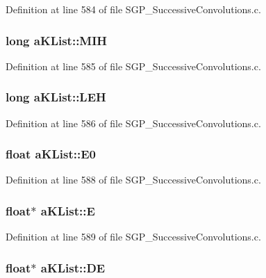 Definition at line 584 of file SGP\_\-SuccessiveConvolutions.c.\hypertarget{structaKList_8f19ff32d2995a7f54a9fbd164cdb29a}{
\subsubsection[MIH]{\setlength{\rightskip}{0pt plus 5cm}long {\bf aKList::MIH}}}
\label{d8/d05/structaKList_8f19ff32d2995a7f54a9fbd164cdb29a}




Definition at line 585 of file SGP\_\-SuccessiveConvolutions.c.\hypertarget{structaKList_dd2efa31b64b23ce2cf507e0197f8bbb}{
\subsubsection[LEH]{\setlength{\rightskip}{0pt plus 5cm}long {\bf aKList::LEH}}}
\label{d8/d05/structaKList_dd2efa31b64b23ce2cf507e0197f8bbb}




Definition at line 586 of file SGP\_\-SuccessiveConvolutions.c.\hypertarget{structaKList_5da44533db17bc1ecaf020e2741028e3}{
\subsubsection[E0]{\setlength{\rightskip}{0pt plus 5cm}float {\bf aKList::E0}}}
\label{d8/d05/structaKList_5da44533db17bc1ecaf020e2741028e3}




Definition at line 588 of file SGP\_\-SuccessiveConvolutions.c.\hypertarget{structaKList_0fe402e9c4b1c9abc06508de5732dfde}{
\subsubsection[E]{\setlength{\rightskip}{0pt plus 5cm}float$\ast$ {\bf aKList::E}}}
\label{d8/d05/structaKList_0fe402e9c4b1c9abc06508de5732dfde}




Definition at line 589 of file SGP\_\-SuccessiveConvolutions.c.\hypertarget{structaKList_a37a11d7702cf2620b71f2d33cf96bc7}{
\subsubsection[DE]{\setlength{\rightskip}{0pt plus 5cm}float$\ast$ {\bf aKList::DE}}}
\label{d8/d05/structaKList_a37a11d7702cf2620b71f2d33cf96bc7}




